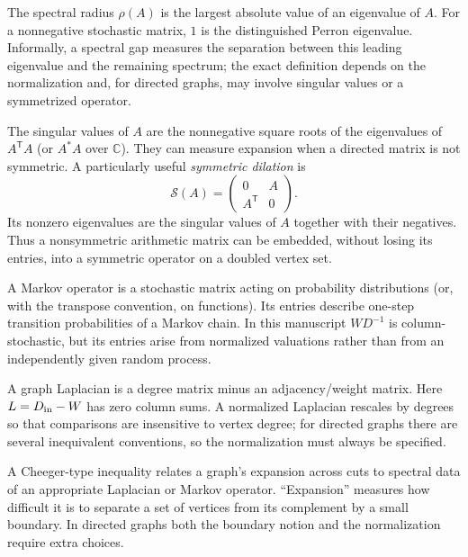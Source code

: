 \documentclass[11pt]{article}
\theoremstyle{definition}
\theoremstyle{remark}
\begin{document}
\begin{description}[style=nextline,leftmargin=1.5em]
\item[Spectral radius, Perron eigenvalue, and spectral gap.]
The spectral radius $\rho(A)$ is the largest absolute value of an eigenvalue
of $A$.  For a nonnegative stochastic matrix, $1$ is the distinguished
Perron eigenvalue.  Informally, a spectral gap measures the separation
between this leading eigenvalue and the remaining spectrum; the exact
definition depends on the normalization and, for directed graphs, may involve
singular values or a symmetrized operator.

\item[Singular value, symmetric dilation, and symmetrization.]
The singular values of $A$ are the nonnegative square roots of the eigenvalues
of $A^{\mathsf T}A$ (or $A^*A$ over $\mathbb C$).  They can measure expansion
when a directed matrix is not symmetric.  A particularly useful
\emph{symmetric dilation} is
\[
\mathcal S(A)=\begin{pmatrix}0&A\\A^{\mathsf T}&0\end{pmatrix}.
\]
Its nonzero eigenvalues are the singular values of $A$ together with their
negatives.  Thus a nonsymmetric arithmetic matrix can be embedded, without
losing its entries, into a symmetric operator on a doubled vertex set.

\item[Markov operator.]
A Markov operator is a stochastic matrix acting on probability distributions
(or, with the transpose convention, on functions).  Its entries describe
one-step transition probabilities of a Markov chain.  In this manuscript
$WD^{-1}$ is column-stochastic, but its entries arise from normalized
valuations rather than from an independently given random process.

\item[Graph Laplacian and normalized Laplacian.]
A graph Laplacian is a degree matrix minus an adjacency/weight matrix.  Here
$L=D_{\rm in}-W$ has zero column sums.  A normalized Laplacian rescales by
degrees so that comparisons are insensitive to vertex degree; for directed
graphs there are several inequivalent conventions, so the normalization must
always be specified.

\item[Cheeger/isoperimetric inequality.]
A Cheeger-type inequality relates a graph's expansion across cuts to spectral
data of an appropriate Laplacian or Markov operator.  ``Expansion'' measures
how difficult it is to separate a set of vertices from its complement by a
small boundary.  In directed graphs both the boundary notion and the
normalization require extra choices.


\end{description}
\end{document}
